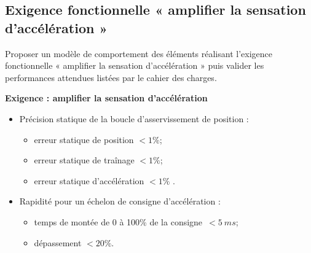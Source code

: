 \documentclass[10pt,fleqn]{article} %
\begin{document}
\begin{multicols}{2}
\subsection*{Exigence fonctionnelle « amplifier la sensation
d'accélération »}

\begin{obj}
Proposer un modèle de comportement des éléments réalisant l'exigence
fonctionnelle « amplifier la sensation d'accélération » puis valider les
performances attendues listées par le cahier des charges.
\end{obj}

\textbf{Exigence : amplifier la sensation d'accélération}
\begin{itemize}
\item  Précision statique de la boucle d'asservissement de position :
\begin{itemize}
\item erreur statique de position $<1\%$;
\item erreur statique de traînage $<1\%$; 
\item erreur statique d'accélération $<1\%$ .
\end{itemize}
\item Rapidité pour un échelon de consigne d'accélération :
\begin{itemize}
\item temps de montée de 0 à 100\% de la consigne~$<\SI{5}{ms}$;
\item dépassement $<20\%$.
\end{itemize}
\end{itemize}


\end{multicols}
\end{document}
